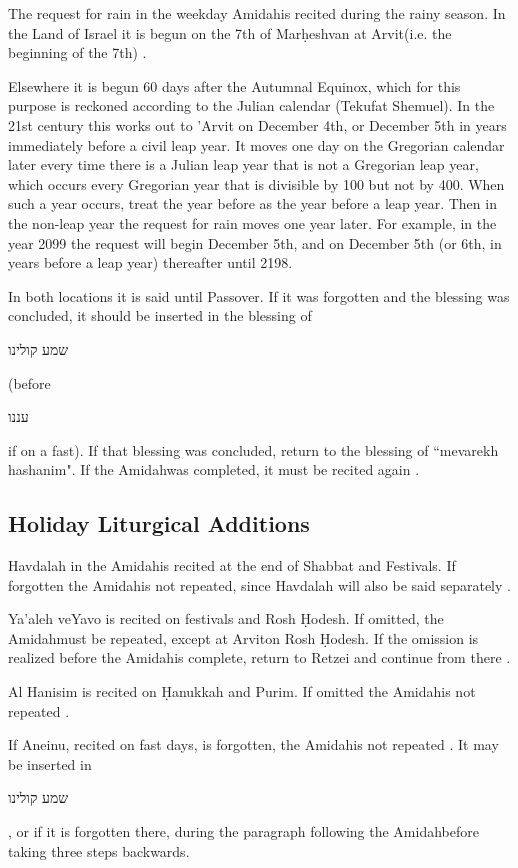 \documentclass[11pt]{article}
\newcommand{\hebword}[1]{‎\begin{hebrew}\beginR #1 \endR\end{hebrew}}
\newcommand{\heth}{\d{h}}
\newcommand{\bigheth}{\d{H}}
\newcommand{\amidah}{Amidah\space}
\newcommand{\arvit}{Arvit}
\begin{document}
The request for rain in the weekday \amidah is recited during the rainy season.  In the Land of Israel it is begun on the 7th of Mar\heth eshvan at \arvit\space (i.e. the beginning of the 7th) \parencite*[18:5 citing OC 117]{PH}.

Elsewhere it is begun 60 days after the Autumnal Equinox, which for this purpose is reckoned according to the Julian calendar (Tekufat Shemuel).  In the 21st century this works out to 'Arvit on December 4th, or December 5th in years immediately before a civil leap year.  It moves one day on the Gregorian calendar later every time there is a Julian leap year that is not a Gregorian leap year, which occurs every Gregorian year that is divisible by 100 but not by 400. When such a year occurs, treat the year before as the year before a leap year.  Then in the non-leap year the request for rain moves one year later.  For example, in the year 2099 the request will begin December 5th, and on December 5th (or 6th, in years before a leap year) thereafter until 2198.

In both locations it is said until Passover. If it was forgotten and the blessing was concluded, it should be inserted in the blessing of \hebword{שמע קולינו} (before \hebword{עננו} if on a fast). If that blessing was concluded, return to the blessing of ``mevarekh hashanim".  If the \amidah was completed, it must be recited again \parencite*{PH}.

\subsection{Holiday Liturgical Additions}

Havdalah in the \amidah is recited at the end of Shabbat and Festivals.  If forgotten the \amidah is not repeated, since Havdalah will also be said separately \parencite*[18:2 citing OC 422]{PH}.

Ya'aleh veYavo is recited on festivals and Rosh \bigheth odesh.  If omitted, the \amidah must be repeated, except at \arvit\space on Rosh \bigheth odesh.  If the omission is realized before the \amidah is complete, return to Retzei and continue from there \parencite{PH}.

Al Hanisim is recited on \bigheth anukkah and Purim.  If omitted the \amidah is not repeated \parencite*[citing OC 682]{PH}.

If Aneinu, recited on fast days, is forgotten, the \amidah is not repeated \parencite*[citing OC 565]{PH}. It may be inserted in \hebword{שמע קולינו}, or if it is forgotten there, during the paragraph following the \amidah before taking three steps backwards.
\end{document}
